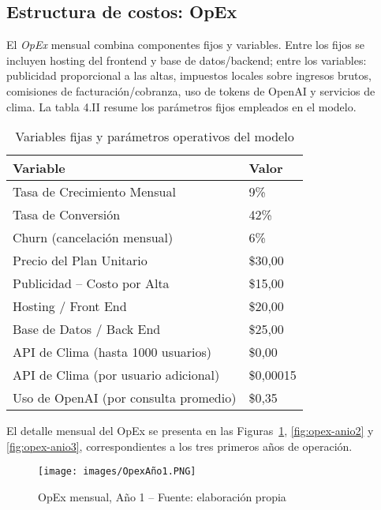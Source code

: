 \subsection{Estructura de costos: OpEx}
El \emph{OpEx} mensual combina componentes fijos y variables. Entre los fijos se incluyen hosting del frontend y base de datos/backend; entre los variables: publicidad proporcional a las altas, impuestos locales sobre ingresos brutos, comisiones de facturación/cobranza, uso de tokens de OpenAI y servicios de clima. La tabla 4.II resume los parámetros fijos empleados en el modelo.

\begin{table}[t]
    \centering
    \renewcommand{\arraystretch}{1.3}
    \caption{Variables fijas y parámetros operativos del modelo}
    \label{tab:variables_fijas}
    \begin{tabular}{|p{6cm}|p{3cm}|}
        \hline
        \textbf{Variable} & \textbf{Valor} \\
        \hline
        Tasa de Crecimiento Mensual & 9\% \\
        \hline
        Tasa de Conversión & 42\% \\
        \hline
        Churn (cancelación mensual) & 6\% \\
        \hline
        Precio del Plan Unitario & \$30,00 \\
        \hline
        Publicidad – Costo por Alta & \$15,00 \\
        \hline
        Hosting / Front End & \$20,00 \\
        \hline
        Base de Datos / Back End & \$25,00 \\
        \hline
        API de Clima (hasta 1000 usuarios) & \$0,00 \\
        \hline
        API de Clima (por usuario adicional) & \$0,00015 \\
        \hline
        Uso de OpenAI (por consulta promedio) & \$0,35 \\
        \hline
    \end{tabular}
\end{table}


El detalle mensual del OpEx se presenta en las Figuras~\ref{fig:opex-anio1}, \ref{fig:opex-anio2} y \ref{fig:opex-anio3}, correspondientes a los tres primeros años de operación.

\begin{figure}[!htbp]
  \centering
  \texttt{[image: images/OpexAño1.PNG]}
  \caption{OpEx mensual, Año 1 -- Fuente: elaboración propia}
  \label{fig:opex-anio1}
\end{figure}

